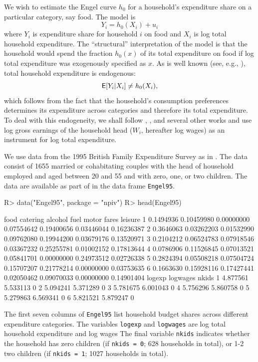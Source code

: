 \documentclass[
]{jss}
\begin{document}
We wish to estimate the Engel curve \(h_0\) for a household's
expenditure share on a particular category, say food. The model is \[
 Y_i = h_0(X_i) + u_i
\] where \(Y_i\) is expenditure share for household \(i\) on food and
\(X_i\) is log total household expenditure. The ``structural''
interpretation of the model is that the household would spend the
fraction \(h_0(x)\) of its total expenditure on food if log total
expenditure was exogenously specified as \(x\). As is well known (see,
e.g., \citet{BBL}), total household expenditure is endogenous: \[
 \mathsf{E}[Y_i | X_i] \neq h_0(X_i),
\] which follows from the fact that the household's consumption
preferences determines its expenditure across categories and therefore
its total expenditure. To deal with this endogeneity, we shall follow
\citet{BBL}, \citet{BCK}, and several other works and use log gross
earnings of the household head (\(W_i\), hereafter log wages) as an
instrument for log total expenditure.

We use data from the 1995 British Family Expenditure Survey as in
\citet{BCK}. The data consist of 1655 married or cohabitating couples
with the head of household employed and aged between 20 and 55 and with
zero, one, or two children. The data are available as part of 
in the data frame \texttt{Engel95}.

\begin{CodeChunk}
\begin{CodeInput}
R> data("Engel95", package = "npiv")
R> head(Engel95)
\end{CodeInput}
\begin{CodeOutput}
       food   catering    alcohol       fuel      motor      fares    leisure
1 0.1494936 0.10459980 0.00000000 0.07554642 0.19400656 0.03446044 0.16236387
2 0.3646063 0.03262203 0.01532990 0.09762080 0.19944200 0.03679176 0.13520971
3 0.2104212 0.06524783 0.07918546 0.03367232 0.25255781 0.01002152 0.17813644
4 0.0786906 0.11526845 0.07013521 0.05841701 0.00000000 0.24973512 0.02726338
5 0.2824394 0.05508218 0.07504724 0.15707207 0.21778214 0.00000000 0.03753635
6 0.1663630 0.15928116 0.17427441 0.02050462 0.09070033 0.00000000 0.14901404
    logexp logwages nkids
1 4.877561 5.533113     0
2 5.094241 5.371289     0
3 5.781675 6.001043     0
4 5.756296 5.860758     0
5 5.279863 6.569341     0
6 5.821521 5.879247     0
\end{CodeOutput}
\end{CodeChunk}

The first seven columns of \texttt{Engel95} list household budget shares
across different expenditure categories. The variables \texttt{logexp}
and \texttt{logwages} are log total household expenditure and log wages
The final variable \texttt{nkids} indicates whether the household has
zero children (if \texttt{nkids\ =\ 0}; 628 households in total), or 1-2
two children (if \texttt{nkids\ =\ 1}; 1027 households in total).
\end{document}
